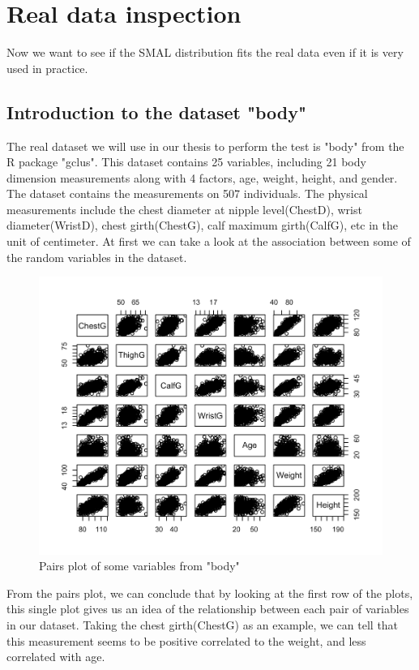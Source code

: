 \documentclass[mstat,12pt]{unswthesis}  %
\numberwithin{equation}{section}
\begin{document}
\chapter{Real data inspection}\label{ccl}
Now we want to see if the SMAL distribution fits the real data even if it is very used in practice.
\section{Introduction to the dataset "body"}
The real dataset we will use in our thesis to perform the test is "body" from the R package "gclus". This dataset contains 25 variables, including 21 body dimension measurements along with 4 factors, age, weight, height, and gender. The dataset contains the measurements on 507 individuals. The physical measurements include the chest diameter at nipple level(ChestD), wrist diameter(WristD), chest girth(ChestG), calf maximum girth(CalfG), etc in the unit of centimeter. At first we can take a look at the association between some of the random variables in the dataset.
\begin{figure}[H]
    \centering
    \includegraphics[width=\linewidth]{body.png}
    \caption{Pairs plot of some variables from "body"}
    \label{fig:my_label}
\end{figure}
From the pairs plot, we can conclude that by looking at the first row of the plots, this 
single plot gives us an idea of the relationship between each pair of variables in our dataset. Taking the chest girth(ChestG) as an example, we can tell that this measurement seems to be positive correlated to the weight, and less correlated with age.
\end{document}
